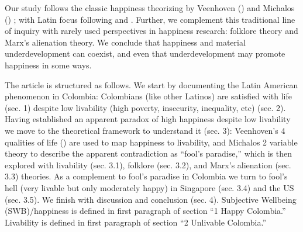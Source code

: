 \documentclass[10pt, letterpaper]{article}
\begin{document}
\begin{spacing}{2}
 Our study follows the classic happiness theorizing by Veenhoven
(\citeyear{veenhoven00b,veenhoven95,veenhoven14b}) and Michalos
(\citeyear{michalos14B})%
; with Latin focus following \citet{rojas15} and \citet{yamamoto16}.
 Further, we complement this traditional line of inquiry with rarely used
perspectives in happiness research: folklore theory and
Marx's alienation theory.   
 We conclude that happiness and material underdevelopment can coexist, and even
 that underdevelopment may promote happiness in some ways.  

 

The article is structured as follows. We start by documenting the Latin American
phenomenon 
\citep{rojas15,rojas2019well} in Colombia: Colombians (like other Latinos) are
satisfied with life (sec. 1) despite low livability (high poverty, insecurity,
inequality, etc) (sec. 2). Having established an apparent paradox of high happiness despite low
livability we move to the theoretical framework to understand it (sec. 3):  Veenhoven's 4 qualities of life
(\citeyear{veenhoven00b}) are used to map happiness to livability, and Michalos 2 variable
theory \citep{michalos14B} to describe the apparent contradiction as ``fool's paradise,'' which is then explored with livability (sec. 3.1), folklore
(sec. 3.2), and Marx's alienation (sec. 3.3) theories. As a complement to fool's paradise in Colombia %
 we turn to
fool's hell (very livable but only moderately happy) in Singapore (sec. 3.4) and
the US (sec. 3.5). We finish with discussion and conclusion (sec. 4).
 Subjective Wellbeing (SWB)/happiness is defined in first paragraph of section
``1 Happy Colombia.''
Livability is defined in first paragraph of section ``2 Unlivable Colombia.''




\end{spacing}
\end{document}
